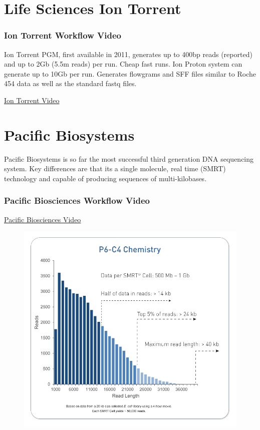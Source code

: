 \documentclass{beamer}
\begin{document}
\section{Life Sciences Ion Torrent}
\begin{frame}
  \frametitle{Ion Torrent Workflow Video}
Ion Torrent PGM, first available in 2011, generates up to 400bp reads (reported) and up to 2Gb (5.5m reads) per run. Cheap fast runs. Ion Proton system can generate up to 10Gb per run. Generates flowgrams and SFF files similar to Roche 454 data as well as the standard fastq files.
  \begin{center}
  \href{https://www.youtube.com/watch?feature=player_embedded&v=MxkYa9XCvBQ}{Ion Torrent Video}
  \end{center}
\end{frame} 

\section {Pacific Biosystems}
\begin{frame}
Pacific Biosystems is so far the most successful third generation DNA sequencing system. Key differences are that its a single molecule, real time (SMRT) technology and capable of producing sequences of multi-kilobases.
  \frametitle{Pacific Biosciences Workflow Video}
  \begin{center}
  \href{http://www.youtube.com/watch?v=NHCJ8PtYCFc&feature=endscreen&NR=1}{Pacific Biosciences Video}
  \end{center}
  \begin{center}
    \begin{figure}
    \includegraphics[scale=0.23]{PacBio-specs.png}
  \end{figure}
  \end{center}
\end{frame} 
\end{document}
